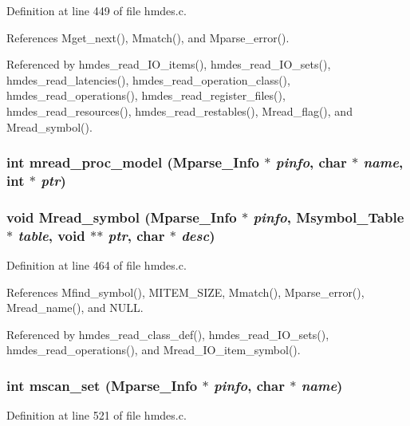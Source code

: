 Definition at line 449 of file hmdes.c.

References Mget\_\-next(), Mmatch(), and Mparse\_\-error().

Referenced by hmdes\_\-read\_\-IO\_\-items(), hmdes\_\-read\_\-IO\_\-sets(), hmdes\_\-read\_\-latencies(), hmdes\_\-read\_\-operation\_\-class(), hmdes\_\-read\_\-operations(), hmdes\_\-read\_\-register\_\-files(), hmdes\_\-read\_\-resources(), hmdes\_\-read\_\-restables(), Mread\_\-flag(), and Mread\_\-symbol().
\subsubsection{\setlength{\rightskip}{0pt plus 5cm}int mread\_\-proc\_\-model (\bf{Mparse\_\-Info} $\ast$ {\em pinfo}, char $\ast$ {\em name}, int $\ast$ {\em ptr})}\label{hmdes_8h_a0d5044667c2d6c7abc5ecc0f0cc045f}


\subsubsection{\setlength{\rightskip}{0pt plus 5cm}void Mread\_\-symbol (\bf{Mparse\_\-Info} $\ast$ {\em pinfo}, \bf{Msymbol\_\-Table} $\ast$ {\em table}, void $\ast$$\ast$ {\em ptr}, char $\ast$ {\em desc})}\label{hmdes_8h_f06d6c42e20b1f16afe72019cce9feb3}




Definition at line 464 of file hmdes.c.

References Mfind\_\-symbol(), MITEM\_\-SIZE, Mmatch(), Mparse\_\-error(), Mread\_\-name(), and NULL.

Referenced by hmdes\_\-read\_\-class\_\-def(), hmdes\_\-read\_\-IO\_\-sets(), hmdes\_\-read\_\-operations(), and Mread\_\-IO\_\-item\_\-symbol().
\subsubsection{\setlength{\rightskip}{0pt plus 5cm}int mscan\_\-set (\bf{Mparse\_\-Info} $\ast$ {\em pinfo}, char $\ast$ {\em name})}\label{hmdes_8h_e31ac28eb1189aa14d222358f54daaae}




Definition at line 521 of file hmdes.c.

